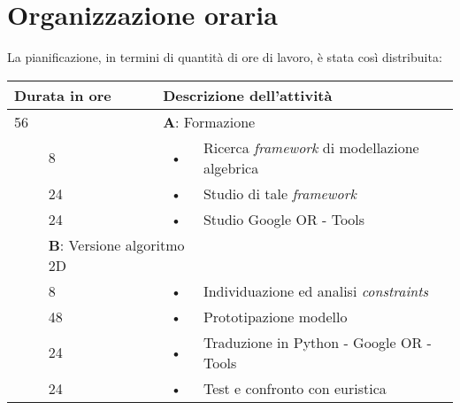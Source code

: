 \section{Organizzazione oraria}
La pianificazione, in termini di quantità di ore di lavoro, è stata così distribuita:
\begin{center}
	\begin{tabular}{|l|l|c l|}
		\hline
		\multicolumn{2}{|l|}{\textbf{Durata in ore}}		&	\multicolumn{2}{l|}{\textbf{Descrizione dell'attività}}\\
		\hline
		\multicolumn{2}{|l|}{56}	&	\multicolumn{2}{l|}{\textbf{A}: Formazione}\\
		\hline
		\multirow{5}{1cm}{ } & 8  & \hspace{5mm}•\hspace{2mm} & Ricerca \textit{framework} di modellazione algebrica \\
		\multirow{5}{1cm}{ } & 24 & \hspace{5mm}•\hspace{2mm} & Studio di tale \textit{framework}                    \\
		\multirow{5}{1cm}{ } & 24 & \hspace{5mm}•\hspace{2mm} & Studio Google OR - Tools                             \\
		\hline
																			
		\multicolumn{2}{|l|}{104}	&	\multicolumn{2}{l|}{\textbf{B}: Versione algoritmo 2D}\\
		\hline
		\multirow{5}{1cm}{ } & 8  & \hspace{5mm}•\hspace{2mm} & Individuazione ed analisi \textit{constraints}       \\
		\multirow{3}{1cm}{ } & 48 & \hspace{5mm}•\hspace{2mm} & Prototipazione modello                               \\
		\multirow{5}{1cm}{ } & 24 & \hspace{5mm}•\hspace{2mm} & Traduzione in Python - Google OR - Tools             \\
		\multirow{5}{1cm}{ } & 24 & \hspace{5mm}•\hspace{2mm} & Test e confronto con euristica                       \\	
		\hline
																			

\end{tabular}
\end{center}
